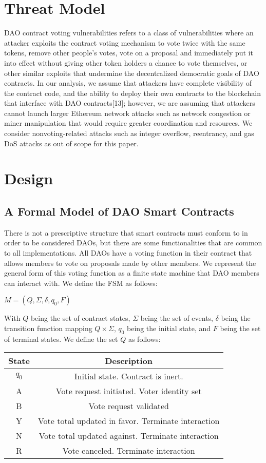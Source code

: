 \documentclass[conference]{IEEEtran}
\begin{document}
\section{Threat Model}
DAO contract voting vulnerabilities refers to a class of vulnerabilities where an attacker exploits the contract voting mechanism to vote twice with the same tokens, remove other people's votes, vote on a proposal and immediately put it into effect without giving other token holders a chance to vote themselves, or other similar exploits that undermine the decentralized democratic goals of DAO contracts. In our analysis, we assume that attackers have complete visibility of the contract code, and the ability to deploy their own contracts to the blockchain that interface with DAO contracts[13]; however, we are assuming that attackers cannot launch larger Ethereum network attacks such as network congestion or miner manipulation that would require greater coordination and resources. We consider nonvoting-related attacks such as integer overflow, reentrancy, and gas DoS attacks as out of scope for this paper. 

\section{Design}

\subsection{A Formal Model of DAO Smart Contracts}
There is not a prescriptive structure that smart contracts must conform to in order to be considered DAOs, but there are some functionalities that are common to all implementations. All DAOs have a voting function in their contract that allows members to vote on proposals made by other members. We represent the general form of this voting function as a finite state machine that DAO members can interact with. We define the FSM as follows:
\begin{center}
$M = (Q, \Sigma, \delta, q_0, F)$
\end{center}

With $Q$ being the set of contract states, $\Sigma$ being the set of events, $\delta$ being the transition function mapping $Q\times\Sigma$, $q_0$ being the initial state, and $F$ being the set of terminal states. 
We define the set $Q$ as follows:
\begin{center}
\begin{tabular}{|c|c|}
\hline
State & Description\\
\hline
$q_0$ & Initial state. Contract is inert.\\
\hline
A & Vote request initiated. Voter identity set\\
\hline
B & Vote request validated\\
\hline
Y & Vote total updated in favor. Terminate interaction \\
\hline
N & Vote total updated against. Terminate interaction\\
\hline
R & Vote canceled. Terminate interaction\\
\hline
\end{tabular}
\end{center}
\end{document}

